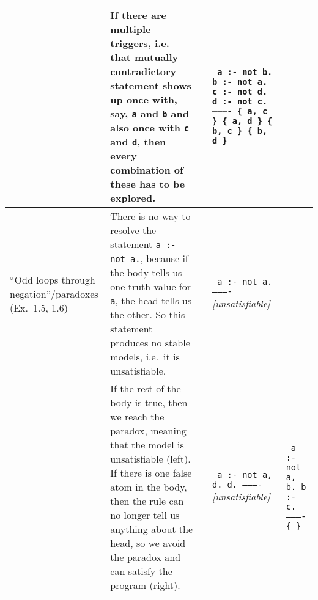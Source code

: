 \documentclass[10pt,a4paper,landscape]{article}
\begin{document}
\begin{longtable}{p{3cm}p{14cm}lp{3.5cm}p{3.5cm}}
		& If there are multiple triggers, i.e. that mutually contradictory statement shows up once with, say, \texttt{a} and \texttt{b} and also once with \texttt{c} and \texttt{d}, then every combination of these has to be explored.
		&& \texttt{%
			a :- not b. \newline
			b :- not a. \newline
			c :- not d. \newline
			d :- not c. \newline
			---------- \newline
			\{ a, c \} \newline
			\{ a, d \} \newline
			\{ b, c \} \newline
			\{ b, d \}}
		&\\ \midrule
	
	``Odd loops \newline through negation''\slash \newline paradoxes \newline (Ex.\ 1.5, 1.6)
		& There is no way to resolve the statement \texttt{a :- not a.}, because if the body tells us one truth value for \texttt{a}, the head tells us the other.
		So this statement produces no stable models, i.e.\ it is unsatisfiable.		
		&& \texttt{%
			a :- not a. \newline
			---------- \newline}
			\textit{[unsatisfiable]}
		& \\ %
		
		& If the rest of the body is true, then we reach the paradox, meaning that the model is unsatisfiable (left).
		If there is one false atom in the body, then the rule can no longer tell us anything about the head, so we avoid the paradox and can satisfy the program (right).
		&& \texttt{%
			a :- not a, d. \newline
			d. \newline
			---------- \newline}
			\textit{[unsatisfiable]}
		& \texttt{%
			a :- not a, b. \newline
			b :- c. \newline
			---------- \newline
			\{ \} } \\ \midrule


\end{longtable}
\end{document}
